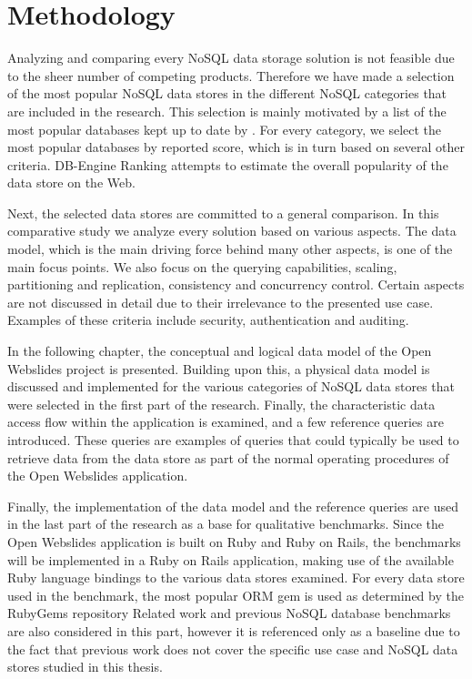 
\chapter{Methodology}
\label{ch:methodology}

Analyzing and comparing every NoSQL data storage solution is not feasible due to the sheer number of competing products.
Therefore we have made a selection of the most popular NoSQL data stores in the different NoSQL categories that are included in the research.
This selection is mainly motivated by a list of the most popular databases kept up to date by \textcite{DBEngine2018}.
For every category, we select the most popular databases by reported score, which is in turn based on several other criteria.
DB-Engine Ranking attempts to estimate the overall popularity of the data store on the Web.

Next, the selected data stores are committed to a general comparison.
In this comparative study we analyze every solution based on various aspects.
The data model, which is the main driving force behind many other aspects, is one of the main focus points.
We also focus on the querying capabilities, scaling, partitioning and replication, consistency and concurrency control.
Certain aspects are not discussed in detail due to their irrelevance to the presented use case.
Examples of these criteria include security, authentication and auditing.

In the following chapter, the conceptual and logical data model of the Open Webslides project is presented.
Building upon this, a physical data model is discussed and implemented for the various categories of NoSQL data stores that were selected in the first part of the research.
Finally, the characteristic data access flow within the application is examined, and a few reference queries are introduced.
These queries are examples of queries that could typically be used to retrieve data from the data store as part of the normal operating procedures of the Open Webslides application.

Finally, the implementation of the data model and the reference queries are used in the last part of the research as a base for qualitative benchmarks.
Since the Open Webslides application is built on Ruby and Ruby on Rails, the benchmarks will be implemented in a Ruby on Rails application, making use of the available Ruby language bindings to the various data stores examined.
For every data store used in the benchmark, the most popular ORM gem is used as determined by the RubyGems repository
Related work and previous NoSQL database benchmarks are also considered in this part, however it is referenced only as a baseline due to the fact that previous work does not cover the specific use case and NoSQL data stores studied in this thesis.
